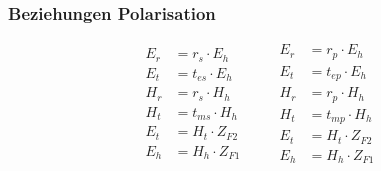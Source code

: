\subsubsection*{Beziehungen Polarisation}
\begin{equation*}
\begin{aligned}
	E_r & = r_s \cdot E_h    \\
	E_t & = t_{es} \cdot E_h \\
	H_r & = r_s \cdot H_h    \\
	H_t & = t_{ms} \cdot H_h \\
	E_t & = H_t\cdot Z_{F2}  \\
	E_h & = H_h\cdot Z_{F1}
\end{aligned}
\qquad
\begin{aligned}
    E_r & = r_p\cdot E_h    \\
    E_t & = t_{ep}\cdot E_h \\
    H_r & = r_p\cdot H_h    \\
    H_t & = t_{mp}\cdot H_h \\
    E_t & = H_t\cdot Z_{F2} \\
    E_h & = H_h\cdot Z_{F1}
\end{aligned}
\end{equation*}


